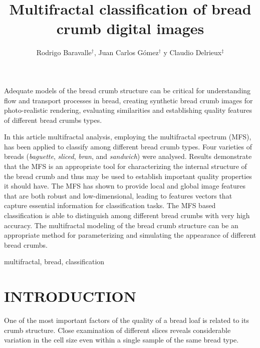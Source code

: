 \documentclass[a4paper,10pt]{article}
\affiliation{
\dag Laboratorio de Sistemas Din\'amicos y Procesamiento de Informaci\'on \\
     FCEIA, Universidad Nacional de Rosario, - CIFASIS - CONICET \\
     \{baravalle,gomez\}@cifasis-conicet.gov.ar \\
\ddag DIEC, Universidad Nacional del Sur - IIIE-CONICET \\
    {\ cad@uns.edu.ar}
}
\begin{document}
\title{Multifractal classification of bread crumb digital images}
\author{Rodrigo Baravalle$^{\dag }$, Juan Carlos G\'omez$^{\dag }$ y Claudio Delrieux$^{\ddag }$}
\maketitle


\balance

\abstract
Adequate models of the bread crumb structure can be critical for understanding flow and transport
processes in bread, creating synthetic bread crumb images for photo-realistic rendering, evaluating similarities and establishing quality features of different bread crumbs types.

In this article multifractal analysis, employing the multifractal spectrum (MFS), has been applied to classify among different bread crumb types. Four varieties of breads ({\em baguette}, {\em sliced}, {\em bran}, and {\em sandwich}) were analysed. Results demonstrate that the MFS is an appropriate tool for characterizing the internal structure of the bread crumb and thus may be used to establish important quality properties it should have. The MFS has shown to provide local and global image features that are both robust and low-dimensional, leading to features vectors that capture essential information for classification tasks. The MFS based classification is able to distinguish among different bread crumbs with very high accuracy. The multifractal modeling of the bread crumb structure can be an appropriate method for parameterizing and simulating the appearance of different bread crumbs.
\endabstract

\keywords
multifractal, bread, classification
\endpalabras

\section{INTRODUCTION}
One of the most important factors of the quality of a bread loaf is related to its crumb structure. Close examination of different slices reveals considerable variation in the cell size even within a single sample of the same bread type. 
\end{document}
